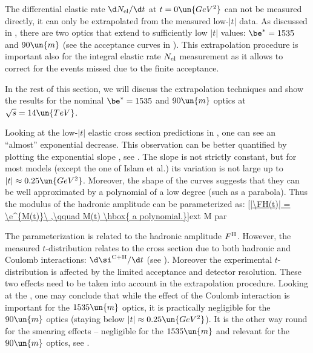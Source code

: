 The differential elastic rate $\d N_{\rm el}/\d t$ at $t=0\un{GeV^2}$ can not be measured directly, it can only be extrapolated from the measured low-$|t|$ data. As discussed in , there are two optics that extend to sufficiently low $|t|$ values: $\be^* = 1535$ and $90\un{m}$ (see the acceptance curves in ). This extrapolation procedure is important also for the integral elastic rate $N_{\rm el}$ measurement as it allows to correct for the events missed due to the finite acceptance.

In the rest of this section, we will discuss the extrapolation techniques and show the results for the nominal $\be^* = 1535$ and $90\un{m}$ optics at $\sqrt s = 14\un{TeV}$.

Looking at the low-$|t|$ elastic cross section predictions in , one can see an ``almost'' exponential decrease. This observation can be better quantified by plotting the exponential slope , see . The slope is not strictly constant, but for most models (except the one of Islam et al.) its variation is not large up to $|t| \approx 0.25\un{GeV^2}$. Moreover, the shape of the curves suggests that they can be well approximated by a polynomial of a low degree (such as a parabola). Thus the modulus of the hadronic amplitude can be parameterized as:
\eqref{|\FH(t)| = \e^{M(t)}\ ,\qquad M(t) \hbox{ a polynomial.}}{ext M par}


The parameterization  is related to the hadronic amplitude $F^{\rm H}$. However, the measured $t$-distribution relates to the cross section due to both hadronic and Coulomb interactions: $\d\si^{\rm C+H}/\d t$ (see ). Moreover the experimental $t$-distribution is affected by the limited acceptance and detector resolution. These two effects need to be taken into account in the extrapolation procedure. Looking at the , one may conclude that while the effect of the Coulomb interaction is important for the $1535\un{m}$ optics, it is practically negligible for the $90\un{m}$ optics (staying below $|t| \approx 0.25\un{GeV^2}$). It is the other way round for the smearing effects -- negligible for the $1535\un{m}$ and relevant for the $90\un{m}$ optics, see .

